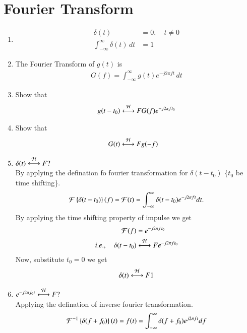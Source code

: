 \documentclass[journal,12pt,twocolumn]{IEEEtran}
\renewcommand\thesection{\arabic{section}}
\begin{document}
\section{Fourier Transform}
\begin{enumerate}[label=\thesection.\arabic*
	,ref=\thesection.\theenumi]
	\item 
		\begin{align}
			\delta(t)&=0, \quad t\neq 0\\
			\int_{-\infty}^{\infty}\delta(t) \, dt&= 1
		\end{align}
	 \item The Fourier Transform of $g(t)$ is
	 \begin{align}
	 G(f)=\int_{-\infty}^{\infty}g(t)e^{-j2\pi ft}\,dt
	 \end{align}
	 \item Show that 
	 \begin{align}
		 g(t-t_0)&\overset{\mathcal{H}}{ \longleftrightarrow}{F}G(f)e^{-j2\pi ft_0}\\
	 \end{align}
	 \solution
	 \item Show that 
	 \begin{align}
		 G(t)&\overset{\mathcal{H}}{ \longleftrightarrow}{F}g(-f)
	 \end{align}
	 \solution
	 \item $\delta(t)\overset{\mathcal{H}}{ \longleftrightarrow}{F}?$\\
	 \solution By applying the defination fo fourier transformation for $\delta(t-t_0)$ \{$t_0$ be time shifting\}.
	 \begin{align}
		\mathcal{F}\left\{\delta(t-t_0)\right\}(f) = \mathcal{F}(t)= \int_{-\infty}^{\infty} \delta(t-t_0)e^{-j2\pi ft}dt.
	 \end{align}
	 By applying the time shifting property of impulse we get
	 \begin{align}
		\mathcal{F}(f) &= e^{-j2\pi ft_0}\\
		i.e., \quad \delta(t-t_0) &\overset{\mathcal{H}}{ \longleftrightarrow}{F} e^{-j2\pi ft_0}
	 \end{align}
	 Now, substitute $t_0 = 0$ we get 
	 \begin{align}
		\delta(t) \overset{\mathcal{H}}{ \longleftrightarrow}{F} 1
	 \end{align}
	 \item $e^{-j2\pi f_0t}\overset{\mathcal{H}}{ \longleftrightarrow}{F}?$\\
	 \solution Applying the defination of inverse fourier transformation.
	 \begin{align}
		\mathcal{F}^{-1}\left\{\delta(f+f_0)\right\}(t) = f(t)= \int_{-\infty}^{\infty}\delta(f+f_0)e^{j2\pi ft}df
	 \end{align}

\end{enumerate}
\end{document}
